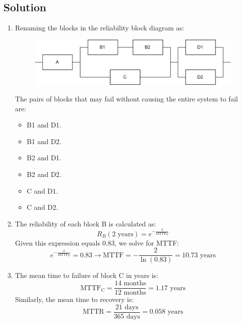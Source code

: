 \subsection*{Solution}
\begin{enumerate}
    \item Renaming the blocks in the reliability block diagram as:
        \begin{figure}[H]
            \centering
            \includegraphics[width=0.7\linewidth]{images/rbd3.png}
        \end{figure}
        The pairs of blocks that may fail without causing the entire system to fail are:
        \begin{itemize}
            \item B1 and D1. 
            \item B1 and D2.
            \item B2 and D1. 
            \item B2 and D2.
            \item C and D1. 
            \item C and D2.
        \end{itemize}
    \item The reliability of each block B is calculated as:
        \[R_B(2 \text{ years})=e^{-\frac{2}{\text{MTTF}_{\text{B}}}}\]
        Given this expression equals $0.83$, we solve for MTTF:
        \[e^{-\frac{2}{\text{MTTF}_{\text{B}}}}=0.83 \rightarrow \text{MTTF}=-\dfrac{2}{\ln(0.83)}=10.73 \text{ years}\]
    \item The mean time to failure of block C in years is:
        \[\text{MTTF}_{\text{C}}=\dfrac{14 \text{ months}}{12 \text{ months}}=1.17 \text{ years}\]
        Similarly, the mean time to recovery is:
        \[\text{MTTR}=\dfrac{21 \text{ days}}{365 \text{ days}}=0.058 \text{ years}\]
        

\end{enumerate}
